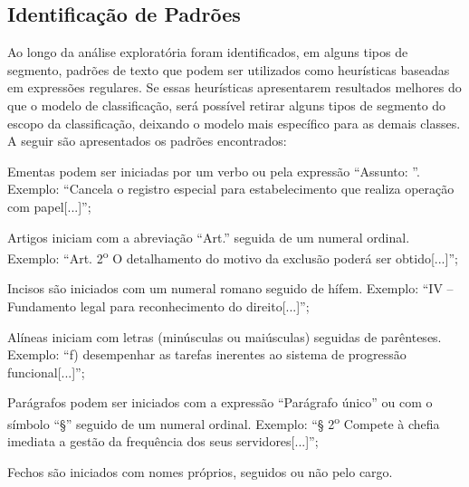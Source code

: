 \subsection{Identificação de Padrões}

Ao longo da análise exploratória foram identificados, em alguns tipos de segmento, padrões de texto  que podem ser utilizados como heurísticas baseadas em expressões regulares. Se essas heurísticas apresentarem resultados melhores do que o modelo de classificação, será possível retirar alguns tipos de segmento do escopo da classificação, deixando o modelo mais específico para as demais classes. A seguir são apresentados os padrões encontrados:

\begin{alineas}
	\item Ementas podem ser iniciadas por um verbo ou pela expressão ``Assunto: ''. Exemplo: ``Cancela o registro especial para estabelecimento que realiza operação com papel[...]'';
	\item Artigos iniciam com a abreviação ``Art.'' seguida de um numeral ordinal. Exemplo: ``Art. 2\textsuperscript{o} O detalhamento do motivo da exclusão poderá ser obtido[...]'';
	\item Incisos são iniciados com um numeral romano seguido de hífem. Exemplo: ``IV – Fundamento legal para reconhecimento do direito[...]'';
	\item Alíneas iniciam com letras (minúsculas ou maiúsculas) seguidas de parênteses. Exemplo: ``f) desempenhar as tarefas inerentes ao sistema de progressão funcional[...]'';
	\item Parágrafos podem ser iniciados com a expressão ``Parágrafo único'' ou com o símbolo ``§'' seguido de um numeral ordinal. Exemplo: ``§ 2\textsuperscript{o} Compete à chefia imediata a gestão da frequência dos seus servidores[...]'';
	\item Fechos são iniciados com nomes próprios, seguidos ou não pelo cargo.
\end{alineas}

    
